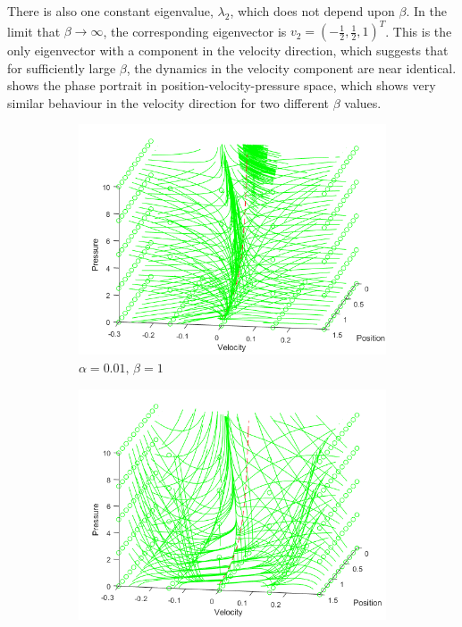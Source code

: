 There is also one constant eigenvalue, $\lambda_2$, which does not depend upon $\beta$. In the limit that $\beta \rightarrow \infty$, the corresponding eigenvector is $v_2 = \left( - \frac{1}{2}, \frac{1}{2}, 1 \right)^T$. This is the only eigenvector with a component in  the velocity direction, which suggests that for sufficiently large $\beta$, the dynamics in the velocity component are near identical.  shows the phase portrait in position-velocity-pressure space, which shows very similar behaviour in the velocity direction for two different $\beta$ values.
~
% 
\begin{figure}[ht]
    \centering
    \begin{subfigure}{0.49\textwidth}
    \includegraphics[width=\textwidth]{Figures/LowFlow/3DPhase-b=1.png}
    \caption{$\alpha = 0.01, \, \beta = 1$}
    \end{subfigure}
    \begin{subfigure}{0.49\textwidth}
    \includegraphics[width=\textwidth]{Figures/LowFlow/3DPhase-b=10.png}

\end{subfigure}
\end{figure}
